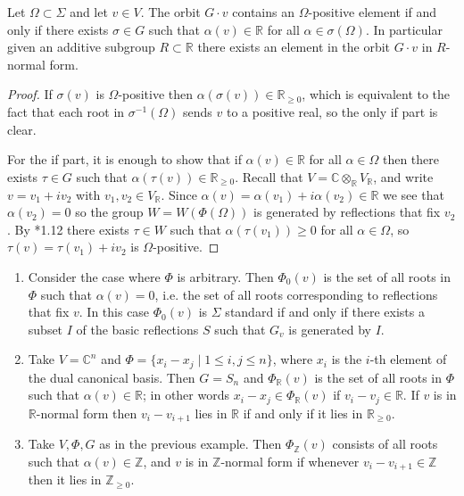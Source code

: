 \documentclass[11pt,fleqn]{article}
\newcommand\CC{\mathbb C}
\newcommand\RR{\mathbb R}
\newcommand\ZZ{\mathbb Z}
\newcommand\ot{\otimes}
\begin{document}
\begin{Lemma*}
Let $\Omega \subset \Sigma$ and let $v \in V$. The orbit $G \cdot v$ contains
an $\Omega$-positive element if and only if there exists $\sigma \in G$ such 
that $\alpha(v) \in \RR$ for all $\alpha \in \sigma(\Omega)$. In particular
given an additive subgroup $R \subset \RR$ there exists an element in the 
orbit $G \cdot v$ in $R$-normal form.
\end{Lemma*}
\begin{proof}
If $\sigma(v)$ is $\Omega$-positive then $\alpha(\sigma(v)) \in \RR_{\geq 0}$,
which is equivalent to the fact that each root in $\sigma^{-1}(\Omega)$ sends
$v$ to a positive real, so the only if part is clear.

For the if part, it is enough to show that if $\alpha(v) \in \RR$ for all 
$\alpha \in \Omega$ then there exists $\tau \in G$ such that $\alpha(\tau(v))
\in \RR_{\geq 0}$. Recall that $V = \CC \ot_\RR V_\RR$, and write $v = v_1 + 
i v_2$ with $v_1, v_2 \in V_\RR$. Since $\alpha(v) = \alpha(v_1) + i 
\alpha(v_2) \in \RR$ we see that $\alpha(v_2) = 0$ so the group $W = 
W(\Phi(\Omega))$ is generated by reflections that fix $v_2$. By 
\cite{Hump-coxeter-book}*{1.12} there exists $\tau \in W$ such that $\alpha
(\tau(v_1)) \geq 0$ for all $\alpha \in \Omega$, so $\tau(v) = \tau(v_1) + 
i v_2$ is $\Omega$-positive.
\end{proof}

\begin{Example*}
\begin{enumerate}
\item Consider the case where $\Phi$ is arbitrary. Then $\Phi_0(v)$ is the set 
of all roots in $\Phi$ such that $\alpha(v) = 0$, i.e. the set of all roots 
corresponding to reflections that fix $v$. In this case $\Phi_0(v)$ is 
$\Sigma$ standard if and only if there exists a subset $I$ of the basic 
reflections $S$ such that $G_v$ is generated by $I$.

\item Take $V = \CC^n$ and $\Phi = \{x_i - x_j \mid 1 \leq i,j \leq n\}$, 
where $x_i$ is the $i$-th element of the dual canonical basis. Then $G= S_n$ 
and $\Phi_\RR(v)$ is the set of all roots in $\Phi$ such that $\alpha(v) \in 
\RR$; in other words $x_i - x_j \in \Phi_\RR(v)$ if $v_i - v_j \in \RR$. If $v$
is in $\RR$-normal form then $v_i - v_{i+1}$ lies in $\RR$ if and only if it 
lies in $\RR_{\geq 0}$.

\item Take $V, \Phi, G$ as in the previous example. Then $\Phi_\ZZ(v)$ consists
of all roots such that $\alpha(v) \in \ZZ$, and $v$ is in $\ZZ$-normal form if
whenever $v_ i - v_{i+1} \in \ZZ$ then it lies in $\ZZ_{\geq 0}$.
\end{enumerate}
\end{Example*}
\end{document}
